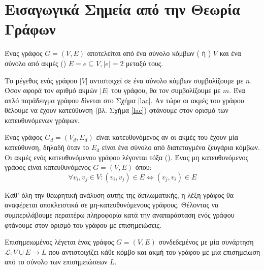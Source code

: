 \section{Εισαγωγικά Σημεία από την Θεωρία Γράφων}
\begin{definition}[Γράφος]
Ένας γράφος $G = (V, E)$ αποτελείται από ένα σύνολο κόμβων ( ή ) $V$ και ένα σύνολο από ακμές () $ E = {e \subseteq V, |e|=2}$ μεταξύ τους.
\end{definition}
Το μέγεθος ενός γράφου $|V|$ αντιστοιχεί σε ένα σύνολο κόμβων συμβολίζουμε με $n$. Όσον αφορά τον αριθμό ακμών $|E|$ του γράφου, θα τον συμβολίζουμε με $m$. Ένα απλό παράδειγμα γράφου δίνεται στο Σχήμα \ref{lac}.
Αν τώρα οι ακμές του γράφου θέλουμε να έχουν κατεύθυνση (βλ. Σχήμα \ref{lac}) φτάνουμε στον ορισμό των κατευθυνόμενων γράφων.
\begin{definition}
Ένας γράφος $G_{d} = (V_{d}, E_{d})$ είναι κατευθυνόμενος αν οι ακμές του έχουν μία κατεύθυνση, δηλαδή όταν το $E_{d}$ είναι ένα σύνολο από διατεταγμένα ζευγάρια κόμβων.
Οι ακμές ενός κατευθυνόμενου γράφου λέγονται τόξα ().
Ένας μη κατευθυνόμενος γράφος είναι κατευθυνόμενος $G = ( V, E )$ όπου:
$$\forall v_{i}, v_{j} \in V: (v_{i}, v_{j}) \in E \Leftrightarrow (v_{j}, v_{i}) \in E$$
\end{definition}
Καθ' όλη την θεωρητική ανάλυση αυτής της διπλωματικής, η λέξη γράφος θα αναφέρεται αποκλειστικά σε μη-κατευθυνόμενους γράφους.
Θέλοντας να συμπεριλάβουμε περαιτέρω πληροφορία κατά την αναπαράσταση ενός γράφου φτάνουμε στον ορισμό του γράφου με επισημειώσεις.
\begin{definition}
Επισημειωμένος λέγεται ένας γράφος $G = ( V, E )$ συνδεδεμένος με μία συνάρτηση $\mathcal{L} : V \cup E \to L$ που αντιστοιχίζει κάθε κόμβο και ακμή του γράφου με μία επισημείωση από το σύνολο των επισημειώσεων $L$.
\label{def:labeled_graphs}
\end{definition}

